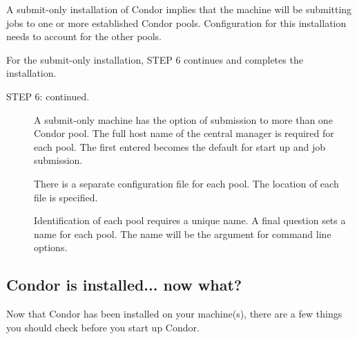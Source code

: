 A submit-only installation of Condor implies that the machine will
be submitting jobs to one or more established Condor pools.
Configuration for this installation needs to account for the
other pools.

For the submit-only installation, STEP 6 continues and completes
the installation.

\begin{description}

\item[STEP 6: continued. ]
     A submit-only machine has the option of submission to more than
     one Condor pool.
     The full host name of the central manager is required for each
     pool.
     The first entered becomes the default for start up and job
     submission.

     There is a separate configuration file for each pool.
     The location of each file is specified.

     Identification of each pool requires a unique name. 
     A final question sets a name for each pool.
     The name will be the argument for  command line options.

\end{description}

\subsection{\label{installed-now-what}
Condor is installed... now what?}

Now that Condor has been installed on your machine(s), there are a few
things you should check before you start up Condor.

